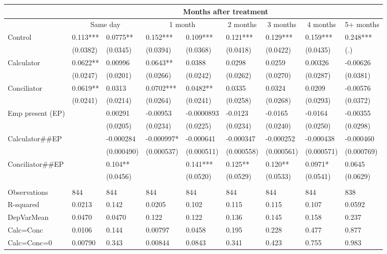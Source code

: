 \begin{tabular}{lllllllll}
      & \multicolumn{8}{c}{Months after treatment} \\
\midrule
      & \multicolumn{2}{c}{Same day} & \multicolumn{2}{c}{1 month} & \multicolumn{1}{c}{2 months} & \multicolumn{1}{c}{3 months} & \multicolumn{1}{c}{4 months} & \multicolumn{1}{c}{5+ months} \\
\midrule
\midrule
Control & 0.113*** & 0.0775** & 0.152*** & 0.109*** & 0.121*** & 0.129*** & 0.159*** & 0.248*** \\
      & (0.0382) & (0.0345) & (0.0394) & (0.0368) & (0.0418) & (0.0422) & (0.0435) & (.) \\
Calculator & 0.0622** & 0.00996 & 0.0643** & 0.0388 & 0.0298 & 0.0259 & 0.00326 & -0.00626 \\
      & (0.0247) & (0.0201) & (0.0266) & (0.0242) & (0.0262) & (0.0270) & (0.0287) & (0.0381) \\
Conciliator & 0.0619** & 0.0313 & 0.0702*** & 0.0482** & 0.0335 & 0.0324 & 0.0209 & -0.00576 \\
      & (0.0241) & (0.0214) & (0.0264) & (0.0241) & (0.0258) & (0.0268) & (0.0293) & (0.0372) \\
Emp present (EP) &       & 0.00291 & -0.00953 & -0.0000893 & -0.0123 & -0.0165 & -0.0164 & -0.00355 \\
      &       & (0.0205) & (0.0234) & (0.0225) & (0.0234) & (0.0240) & (0.0250) & (0.0298) \\
Calculator\#\#EP &       & -0.000284 & -0.000997* & -0.000641 & -0.000347 & -0.000252 & -0.000438 & -0.000460 \\
      &       & (0.000490) & (0.000537) & (0.000511) & (0.000558) & (0.000561) & (0.000571) & (0.000769) \\
Conciliator\#\#EP &       & 0.104** &       & 0.141*** & 0.125** & 0.120** & 0.0971* & 0.0645 \\
      &       & (0.0456) &       & (0.0520) & (0.0529) & (0.0533) & (0.0541) & (0.0629) \\
      &       &       &       &       &       &       &       &  \\
\midrule
Observations & 844   & 844   & 844   & 844   & 844   & 844   & 844   & 838 \\
R-squared & 0.0213 & 0.142 & 0.0205 & 0.102 & 0.115 & 0.115 & 0.107 & 0.0592 \\
DepVarMean & 0.0470 & 0.0470 & 0.122 & 0.122 & 0.136 & 0.145 & 0.158 & 0.237 \\
Calc=Conc & 0.0106 & 0.144 & 0.00797 & 0.0458 & 0.195 & 0.228 & 0.477 & 0.877 \\
Calc=Conc=0 & 0.00790 & 0.343 & 0.00844 & 0.0843 & 0.341 & 0.423 & 0.755 & 0.983 \\
\bottomrule
\bottomrule
\end{tabular}%
